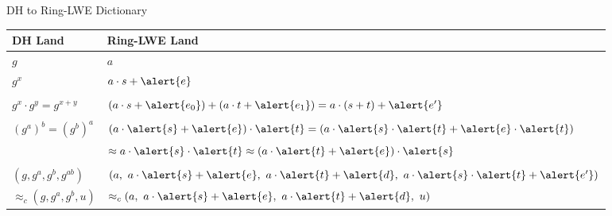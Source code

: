 \documentclass[xcolor=table,10pt,aspectratio=169]{beamer}
\begin{document}
\begin{frame}[label={sec:org51e35bc}]{DH to Ring-LWE Dictionary}
\begin{center}
\begin{tabular}{ll}
\toprule
DH Land & Ring-LWE Land\\
\midrule
\(g\) & \(a\)\\
\(g^x\) & \(a\cdot {s} + \alert{e}\)\\
 & \\
\(g^x \cdot g^y = g^{x+y}\) & \((a\cdot {s} + \alert{e_0}) + (a \cdot {t} + \alert{e_1}) = a \cdot {(s+t)} + \alert{e'}\)\\
 & \\
\((g^a)^b = (g^b)^a\) & \((a\cdot \alert{s} + \alert{e})\cdot \alert{t} = (a\cdot \alert{s} \cdot \alert{t} + \alert{e} \cdot \alert{t})\)\\
 & \(\approx a\cdot \alert{s} \cdot \alert{t} \approx (a\cdot \alert{t} + \alert{e})\cdot \alert{s}\)\\
 & \\
\((g, g^a, g^b, g^{ab})\) & \((a,\ a\cdot \alert{s} + \alert{e},\ a\cdot \alert{t} + \alert{d},\ a \cdot \alert{s} \cdot \alert{t} + \alert{e'})\)\\
\(\approx_c (g, g^a, g^b, u)\) & \(\approx_c (a,\ a\cdot \alert{s} + \alert{e},\ a\cdot \alert{t} + \alert{d},\ u)\)\\
\bottomrule
\end{tabular}

\end{center}
\end{frame}
\end{document}
